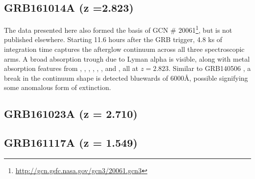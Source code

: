 \documentclass{aa}    %
\begin{document}
\subsection{GRB161014A (z =2.823)}
The data presented here also formed the basis of GCN \#
20061\footnote{\url{http://gcn.gsfc.nasa.gov/gcn3/20061.gcn3}}, but is not
published elsewhere. Starting 11.6 hours after the GRB trigger, 4.8 ks of
integration time captures the afterglow continuum across all three
spectroscopic arms. A broad absorption trough due to Lyman alpha is visible,
along with metal absorption features from \mgii, \SIii, \cii, \civ, \alii,
\aliii, and	\feii, all at $z =2.823$. Similar to GRB140506 \citep{Fynbo2014}, a
break in the continuum shape is detected bluewards of 6000\AA, possible
signifying some anomalous form of extinction.


\subsection{GRB161023A (z = 2.710)}	


\subsection{GRB161117A (z = 1.549)}	
\end{document}
